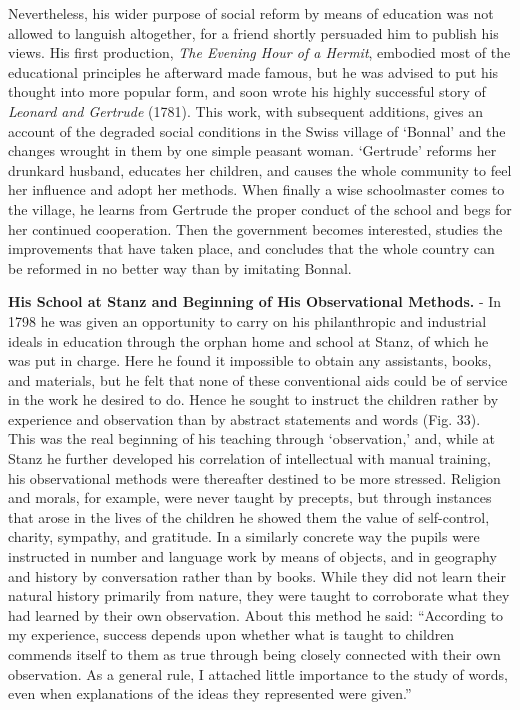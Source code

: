 \documentclass[]{book}
\begin{document}
Nevertheless, his wider purpose of social reform by means of education was not allowed to languish altogether, for a friend shortly persuaded him to publish his views. His first production, \emph{The Evening Hour of a Hermit}, embodied most of the educational principles he afterward made famous, but he was advised to put his thought into more popular form, and soon wrote his highly successful story of \emph{Leonard and Gertrude} (1781). This work, with subsequent additions, gives an account of the degraded social conditions in the Swiss village of `Bonnal' and the changes wrought in them by one simple peasant woman. `Gertrude' reforms her drunkard husband, educates her children, and causes the whole community to feel her influence and adopt her methods. When finally a wise schoolmaster comes to the village, he learns from Gertrude the proper conduct of the school and begs for her continued cooperation. Then the government becomes interested, studies the improvements that have taken place, and concludes that the whole country can be reformed in no better way than by imitating Bonnal.

\textbf{His School at Stanz and Beginning of His Observational Methods.} - In 1798 he was given an opportunity to carry on his philanthropic and industrial ideals in education through the orphan home and school at Stanz, of which he was put in charge. Here he found it impossible to obtain any assistants, books, and materials, but he felt that none of these conventional aids could be of service in the work he desired to do. Hence he sought to instruct the children rather by experience and observation than by abstract statements and words (Fig. 33). This was the real beginning of his teaching through `observation,' and, while at Stanz he further developed his correlation of intellectual with manual training, his observational methods were thereafter destined to be more stressed. Religion and morals, for example, were never taught by precepts, but through instances that arose in the lives of the children he showed them the value of self-control, charity, sympathy, and gratitude. In a similarly concrete way the pupils were instructed in number and language work by means of objects, and in geography and history by conversation rather than by books. While they did not learn their natural history primarily from nature, they were taught to corroborate what they had learned by their own observation. About this method he said: ``According to my experience, success depends upon whether what is taught to children commends itself to them as true through being closely connected with their own observation. As a general rule, I attached little importance to the study of words, even when explanations of the ideas they represented were given.''
\end{document}
